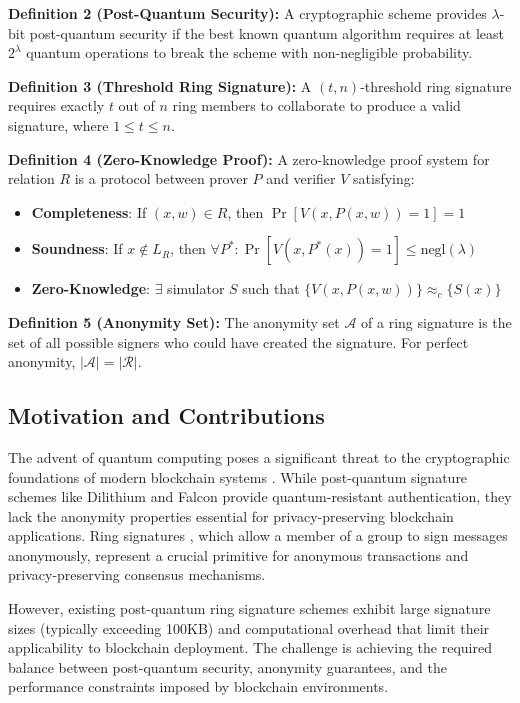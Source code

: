 \documentclass[11pt,a4paper]{article}
\begin{document}
\textbf{Definition 2 (Post-Quantum Security):} A cryptographic scheme provides $\lambda$-bit post-quantum security if the best known quantum algorithm requires at least $2^\lambda$ quantum operations to break the scheme with non-negligible probability.

\textbf{Definition 3 (Threshold Ring Signature):} A $(t,n)$-threshold ring signature requires exactly $t$ out of $n$ ring members to collaborate to produce a valid signature, where $1 \leq t \leq n$.

\textbf{Definition 4 (Zero-Knowledge Proof):} A zero-knowledge proof system for relation $R$ is a protocol between prover $P$ and verifier $V$ satisfying:
\begin{itemize}
\item \textbf{Completeness}: If $(x,w) \in R$, then $\Pr[V(x,P(x,w))=1] = 1$
\item \textbf{Soundness}: If $x \notin L_R$, then $\forall P^*: \Pr[V(x,P^*(x))=1] \leq \text{negl}(\lambda)$
\item \textbf{Zero-Knowledge}: $\exists$ simulator $S$ such that $\{V(x,P(x,w))\} \approx_c \{S(x)\}$
\end{itemize}

\textbf{Definition 5 (Anonymity Set):} The anonymity set $\mathcal{A}$ of a ring signature is the set of all possible signers who could have created the signature. For perfect anonymity, $|\mathcal{A}| = |\mathcal{R}|$.

\subsection{Motivation and Contributions}

The advent of quantum computing poses a significant threat to the cryptographic foundations of modern blockchain systems \cite{shor1997, grover1996}. While post-quantum signature schemes like Dilithium \cite{dilithium2021} and Falcon \cite{falcon2020} provide quantum-resistant authentication, they lack the anonymity properties essential for privacy-preserving blockchain applications. Ring signatures \cite{rivest2001}, which allow a member of a group to sign messages anonymously, represent a crucial primitive for anonymous transactions and privacy-preserving consensus mechanisms.

However, existing post-quantum ring signature schemes exhibit large signature sizes (typically exceeding 100KB) and computational overhead that limit their applicability to blockchain deployment. The challenge is achieving the required balance between post-quantum security, anonymity guarantees, and the performance constraints imposed by blockchain environments.
\end{document}
